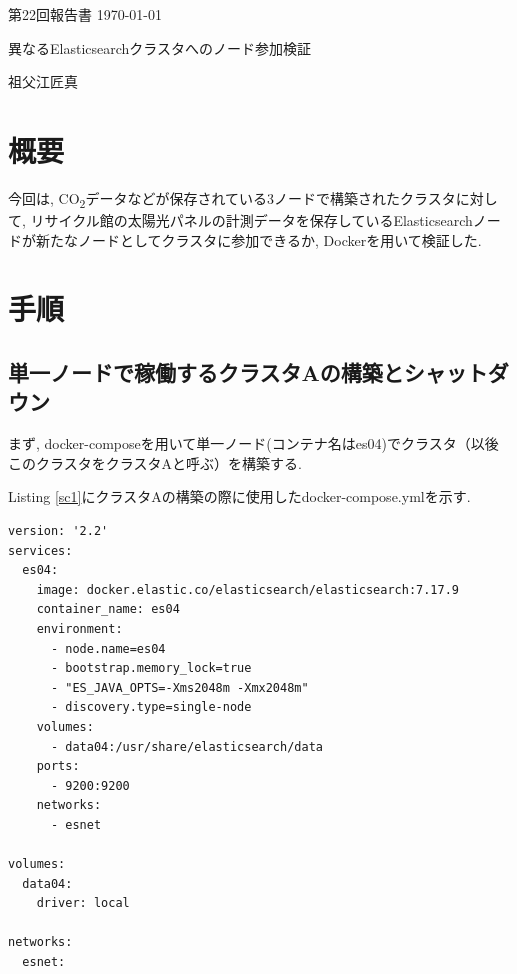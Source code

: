 \documentclass[a4j,12pt,]{jarticle}
\begin{document}
{\noindent\small 第22回報告書 \hfill\today}
\begin{center}
  {\Large 異なるElasticsearchクラスタへのノード参加検証}
\end{center}
\begin{flushright}
  祖父江匠真 \\
\end{flushright}

\section{概要}
今回は, CO\textsubscript{2}データなどが保存されている3ノードで構築されたクラスタに対して, リサイクル館の太陽光パネルの計測データを保存しているElasticsearchノードが新たなノードとしてクラスタに参加できるか, Dockerを用いて検証した.

\section{手順}

\subsection{単一ノードで稼働するクラスタAの構築とシャットダウン}

まず, docker-composeを用いて単一ノード(コンテナ名はes04)でクラスタ（以後このクラスタをクラスタAと呼ぶ）を構築する.

Listing \ref{sc1}にクラスタAの構築の際に使用したdocker-compose.ymlを示す.


\begin{lstlisting}[caption=クラスタAの構築の際に使用したdocker-compose.yml, label=sc1]
version: '2.2'
services:
  es04:
    image: docker.elastic.co/elasticsearch/elasticsearch:7.17.9
    container_name: es04
    environment:
      - node.name=es04
      - bootstrap.memory_lock=true
      - "ES_JAVA_OPTS=-Xms2048m -Xmx2048m"
      - discovery.type=single-node
    volumes:
      - data04:/usr/share/elasticsearch/data
    ports:
      - 9200:9200
    networks:
      - esnet

volumes:
  data04:
    driver: local

networks:
  esnet:
\end{lstlisting}
\end{document}
